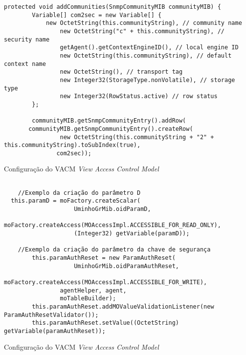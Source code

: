\newpage
\begin{center}
 	 	\begin{verbatim}
protected void addCommunities(SnmpCommunityMIB communityMIB) {
		Variable[] com2sec = new Variable[] { 
			new OctetString(this.communityString), // community name
				new OctetString("c" + this.communityString), // security name
				getAgent().getContextEngineID(), // local engine ID
				new OctetString(this.communityString), // default context name
				new OctetString(), // transport tag
				new Integer32(StorageType.nonVolatile), // storage type
				new Integer32(RowStatus.active) // row status
		};

		communityMIB.getSnmpCommunityEntry().addRow(
       communityMIB.getSnmpCommunityEntry().createRow(
				new OctetString(this.communityString + "2" + this.communityString).toSubIndex(true), 
               com2sec));
\end{verbatim}
 	\captionsetup{type=figure, width=0.8\linewidth}
	\caption{Configuração do VACM \emph{View Access Control Model}}
\label{fig:faseb:} 
\end{center}



\begin{center}
 	 	\begin{verbatim}

	//Exemplo da criação do parâmetro D
  this.paramD = moFactory.createScalar(
					UminhoGrMib.oidParamD,
					moFactory.createAccess(MOAccessImpl.ACCESSIBLE_FOR_READ_ONLY), 
					(Integer32) getVariable(paramD));

	//Exemplo da criação do parâmetro da chave de segurança
		this.paramAuthReset = new ParamAuthReset(
					UminhoGrMib.oidParamAuthReset,
				moFactory.createAccess(MOAccessImpl.ACCESSIBLE_FOR_WRITE), 
				agentHelper, agent,
				moTableBuilder);
		this.paramAuthReset.addMOValueValidationListener(new ParamAuthResetValidator());
		this.paramAuthReset.setValue((OctetString) getVariable(paramAuthReset));
\end{verbatim}
 	\captionsetup{type=figure, width=0.8\linewidth}
	\caption{Configuração do VACM \emph{View Access Control Model}}
\label{fig:faseb:} 
\end{center}







